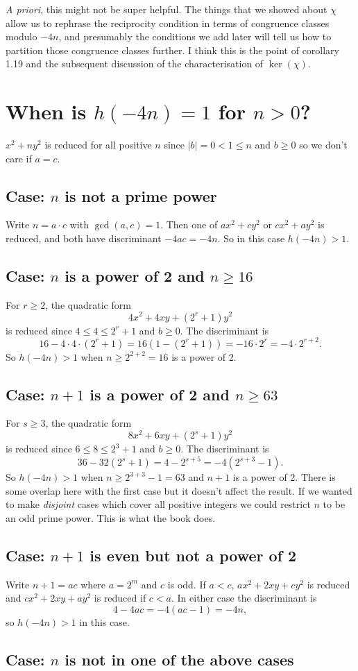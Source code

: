 \emph{A priori}, this might not be super helpful. The things that we showed about $\chi$ allow us to rephrase the reciprocity condition in terms of congruence classes modulo $-4n$, and presumably the conditions we add later will tell us how to partition those congruence classes further. I think this is the point of corollary 1.19 and the subsequent discussion of the characterisation of $\ker(\chi)$.

\section{When is $h(-4n)=1$ for $n>0$?}

$x^2+ny^2$ is reduced for all positive $n$ since $|b|=0< 1\leq n$ and $b\geq 0$ so we don't care if $a=c$.

\subsection{Case: $n$ is not a prime power}

Write $n=a\cdot c$ with $\gcd(a,c)=1$. Then one of $ax^2+cy^2$ or $cx^2+ay^2$ is reduced, and both have discriminant $-4ac=-4n$. So in this case $h(-4n)>1$.

\subsection{Case: $n$ is a power of 2 and $n\geq 16$}

For $r\geq 2$, the quadratic form
\[4x^2+4xy+(2^r+1)y^2\]
is reduced since $4\leq 4\leq 2^r+1$ and $b\geq 0$. The discriminant is
\[16-4\cdot 4\cdot (2^r+1)=16(1-(2^r+1))=-16\cdot 2^r=-4\cdot 2^{r+2}.\]
So $h(-4n)>1$ when $n\geq 2^{2+2}=16$ is a power of 2.

\subsection{Case: $n+1$ is a power of 2 and $n\geq 63$}

For $s\geq 3$, the quadratic form
\[8x^2+6xy+(2^s+1)y^2\]
is reduced since $6\leq 8\leq 2^3+1$ and $b\geq 0$. The discriminant is
\[36-32(2^s+1)=4-2^{s+5}=-4(2^{s+3}-1).\]
So $h(-4n)>1$ when $n\geq 2^{3+3}-1=63$ and $n+1$ is a power of 2. There is some overlap here with the first case but it doesn't affect the result. If we wanted to make \emph{disjoint} cases which cover all positive integers we could restrict $n$ to be an odd prime power. This is what the book does.

\subsection{Case: $n+1$ is even but not a power of 2}

Write $n+1 = ac$ where $a = 2^m$ and $c$ is odd. If $a<c$, $ax^2+2xy+cy^2$ is reduced and $cx^2+2xy+ay^2$ is reduced if $c<a$. In either case the discriminant is
\[4-4ac=-4(ac-1)=-4n,\]
so $h(-4n)>1$ in this case.

\subsection{Case: $n$ is not in one of the above cases}
